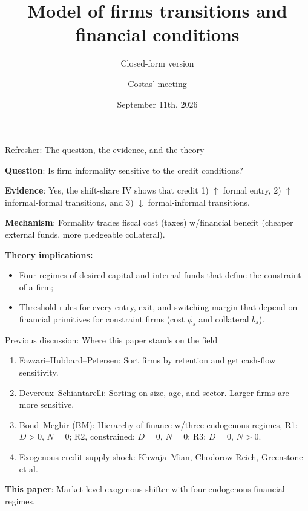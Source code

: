 \documentclass[11pt,aspectratio=169]{beamer}
\title[Formality and finance: theory]{ Model of firms transitions and financial conditions}
\subtitle{Closed-form version}
\author{Costas' meeting}
\date{September 11th, 2026}
\providecommand{\spread}[1]{\phi_{#1}}
\providecommand{\collat}[1]{b_{#1}}
\begin{document}
 
\begin{frame}
\titlepage
\end{frame}
 
\begin{frame}{Refresher: The question, the evidence, and the theory}

\textbf{Question}: Is firm informality sensitive to the credit conditions?

\vspace{8mm}
\textbf{Evidence}: Yes, the shift-share IV shows that credit 1) $\uparrow$ formal entry, 2) $\uparrow$ informal-formal transitions, and 3) $\downarrow$ formal-informal transitions. 
 
\vspace{8mm}
\textbf{Mechanism}: Formality trades fiscal cost (taxes) w/financial benefit (cheaper external funds, more pledgeable collateral).
 
\vspace{8mm}
\textbf{Theory implications:}
\begin{itemize}
    \item Four regimes of desired capital and internal funds that define the constraint of a firm;
    \item Threshold rules for every entry, exit, and switching margin that depend on financial primitives for constraint firms (cost $\spread{s}$ and collateral $\collat{s}$).
\end{itemize}

\end{frame}

\begin{frame}{Previous discussion: Where this paper stands on the field}

\begin{enumerate}
    \item Fazzari–Hubbard–Petersen: Sort firms by retention and get cash-flow sensitivity.
    \vspace{3mm}
    \item Devereux–Schiantarelli: Sorting on size, age, and sector. Larger firms are more sensitive.
    \vspace{3mm}
    \item Bond–Meghir (BM): Hierarchy of finance w/three endogenous regimes, R1: $D>0$, $N=0$; R2, constrained: $D=0$, $N=0$; R3: $D=0$, $N>0$.
    \vspace{3mm}
    \item Exogenous credit supply shock: Khwaja–Mian, Chodorow-Reich, Greenstone et al.
\end{enumerate}

\vspace{5mm}

\textbf{This paper}: Market level exogenous shifter with four endogenous financial regimes.

\end{frame}
 
\end{document}
